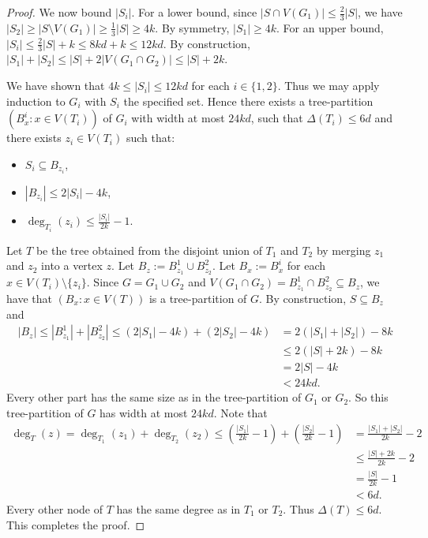 \begin{proof}
We now bound $|S_i|$. For a lower bound, since $|S\cap V(G_1)|\leq \frac23 |S|$, we have $|S_2|\geq |S\setminus V(G_1)|\geq \frac13 |S| \geq 4k $. By symmetry, $|S_1|\geq  4k $. For an upper bound, $|S_i|\leq\frac23 |S| + k \leq 8kd + k \leq 12kd$. By construction, $|S_1|+|S_2|\leq
|S| + 2|V(G_1\cap G_2)| \leq |S|+2k$.

We have shown that $4k \leq |S_i|\leq 12kd$ for each $i\in\{1,2\}$. Thus we may apply induction to $G_i$ with $S_i$ the specified set. Hence there exists a tree-partition $(B^i_x:x\in V(T_i))$ of $G_i$ with width at most $24 kd$, such that $\Delta(T_i)\leq 6d$ and there exists $z_i\in V(T_i)$ such that:
\begin{itemize}
    \item $S_i\subseteq B_{z_i}$, 
    \item $|B_{z_i}|\leq 2|S_i|-4k$,
    \item $\deg_{T_i}(z_i)\leq \frac{|S_i|}{2k} - 1$.
\end{itemize}
Let $T$ be the tree obtained from the disjoint union of $T_1$ and $T_2$ by merging $z_1$ and $z_2$ into a vertex $z$. Let $B_z:= B^1_{z_1}\cup B^2_{z_2}$. Let $B_x:= B^i_x$ for each $x\in V(T_i)\setminus\{z_i\}$. Since $G=G_1\cup G_2$ and $V(G_1\cap G_2) = B^1_{z_1}\cap B^2_{z_2} \subseteq B_z$, we have that $(B_x:x\in V(T))$ is a tree-partition of $G$. By construction, $S\subseteq B_z$ and
\begin{align*}
    |B_z|  \leq |B^1_{z_1}|+|B^2_{z_2}|
     \leq (2|S_1|-4k) +  (2|S_2|-4k)
    & = 2( |S_1|+|S_2|) -8k\\
    & \leq 2(|S|+2k)-8k \\
    & = 2|S|-4 k\\
    & < 24 kd.
\end{align*}
Every other part has the same size as in the tree-partition of $G_1$ or $G_2$. So this tree-partition of $G$ has width at most $24kd$. 
Note that 
\begin{align*}
 \deg_T(z)   = \deg_{T_1}(z_1) + \deg_{T_2}(z_2)
     \leq  (\frac{|S_1|}{2k} -1) + (\frac{|S_2|}{2k} - 1)
    & =  \frac{|S_1|+|S_2|}{2k} -2\\
    & \leq  \frac{|S|+2k}{2k} -2\\
    & =  \frac{|S|}{2k} -1\\
    & <  6 d.
\end{align*}
Every other node of $T$ has the same degree as in $T_1$ or $T_2$. 
Thus $\Delta(T) \leq 6d$. This completes the proof.
\end{proof}

